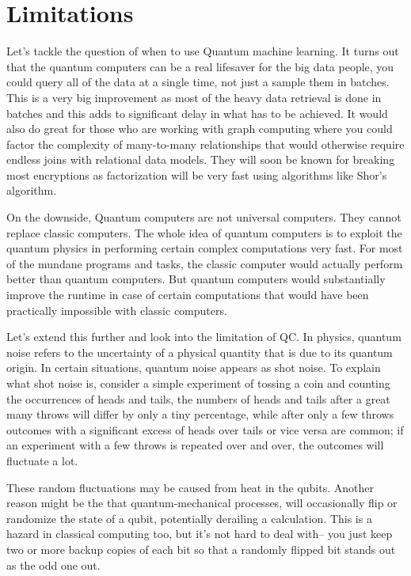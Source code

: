 {\chapter{Limitations}\label{ch:limitations}}
Let's tackle the question of when to use Quantum machine learning. It turns out that the quantum computers can be a real lifesaver for the big data people, you could query all of the data at a single time, not just a sample them in batches. This is a very big improvement as most of the heavy data retrieval is done in batches and this adds to significant delay in what has to be achieved. It would also do great for those who are working with graph computing where you could factor the complexity of many-to-many relationships that would otherwise require endless joins with relational data models. They will soon be known for breaking most encryptions as factorization will be very fast using algorithms like Shor's algorithm.\par\bigskip
On the downside, Quantum computers are not universal computers. They cannot replace classic computers. The whole idea of quantum computers is to exploit the quantum physics in performing certain complex computations very fast. For most of the mundane programs and tasks, the classic computer would actually perform better than quantum computers. But quantum computers would substantially improve the runtime in case of certain computations that would have been practically impossible with classic computers.\par\bigskip
Let's extend this further and look into the limitation of QC.
In physics, quantum noise refers to the uncertainty of a physical quantity that is due to its quantum origin. In certain situations, quantum noise appears as shot noise. To explain what shot noise is, consider a simple experiment of tossing a coin and counting the occurrences of heads and tails, the numbers of heads and tails after a great many throws will differ by only a tiny percentage, while after only a few throws outcomes with a significant excess of heads over tails or vice versa are common; if an experiment with a few throws is repeated over and over, the outcomes will fluctuate a lot.\par\bigskip
These random fluctuations may be caused from heat in the qubits. Another reason might be the that quantum-mechanical processes, will occasionally flip or randomize the state of a qubit, potentially derailing a calculation. This is a hazard in classical computing too, but it's not hard to deal with-- you just keep two or more backup copies of each bit so that a randomly flipped bit stands out as the odd one out. \par\bigskip
